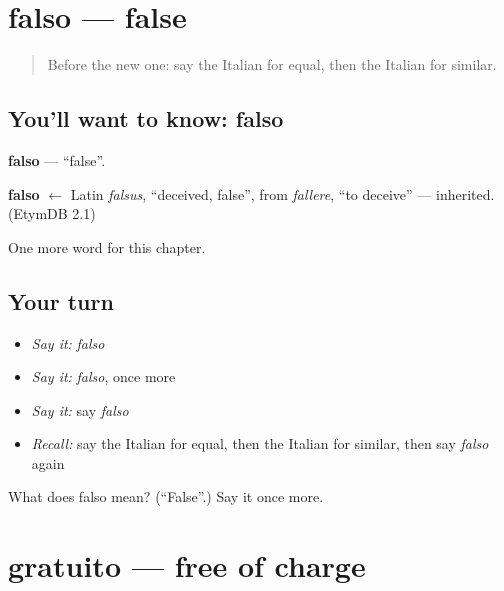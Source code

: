 \section[falso]{falso — false}

\label{lesson:IT-C219-falso}



\begin{quote}
Before the new one: say the Italian for equal, then the Italian for similar.
\end{quote}

\subsection*{You'll want to know: falso}
\textbf{falso} — \textquotedblleft{}false\textquotedblright{}.

\begin{cousinweb}
\textbf{falso} $\leftarrow$ Latin \emph{falsus}, \textquotedblleft{}deceived, false\textquotedblright{}, from \emph{fallere}, \textquotedblleft{}to deceive\textquotedblright{} — inherited. (EtymDB 2.1)
\end{cousinweb}

\begin{grammarlens}[title={What you've built}]
One more word for this chapter.
\end{grammarlens}

\subsection*{Your turn}
\begin{itemize}
\raggedright
  \item \emph{Say it:} \emph{falso}
  \item \emph{Say it:} \emph{falso}, once more
  \item \emph{Say it:} say \emph{falso}
  \item \emph{Recall:} say the Italian for equal, then the Italian for similar, then say \emph{falso} again
\end{itemize}

\begin{tcolorbox}[breakable,colback=teal!4,colframe=teal!35!black,title={Before you move on}]
What does falso mean? (\textquotedblleft{}False\textquotedblright{}.) Say it once more.
\end{tcolorbox}
\section[gratuito]{gratuito — free of charge}

